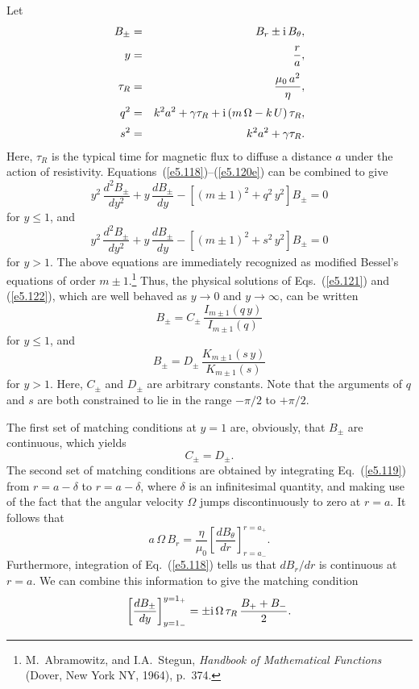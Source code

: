 Let
\begin{eqnarray}
B_\pm &=& B_r \pm {\rm i}\,B_\theta,\\[0.5ex]
y &=& \frac{r}{a},\\[0.5ex]
\tau_R &=& \frac{\mu_0\,a^2}{\eta},\\[0.5ex]
q^2 &=& k^2 a^2 + \gamma\tau_R + {\rm i}\,(m\,{\Omega} - k\,U)\,\tau_R,\\[0.5ex]
s^2 &=& k^2 a^2 + \gamma\tau_R.\label{e5.120e}
\end{eqnarray}
Here, $\tau_R$ is the typical time for magnetic flux to diffuse a distance $a$
under the action of resistivity. Equations~(\ref{e5.118})--(\ref{e5.120e}) can be
combined to give
\begin{equation}\label{e5.121}
y^2\,\frac{d^2 B_\pm}{dy^2} + y\,\frac{d B_\pm}{dy} -\left[(m\pm 1)^2 + q^2\,y^2\right]B_\pm = 0
\end{equation}
for $y\leq 1$, and
\begin{equation}\label{e5.122}
y^2\,\frac{d^2 B_\pm}{dy^2} + y\,\frac{d B_\pm}{dy} -\left[(m\pm 1)^2 + s^2\,y^2\right]B_\pm = 0
\end{equation}
for $y>1$. The above equations are immediately recognized as modified
Bessel's equations of order $m\pm 1$.\footnote{M.~Abramowitz, and I.A.~Stegun, {\em Handbook of Mathematical Functions} (Dover, New York NY, 1964), p.~374.} 
Thus, the physical solutions of Eqs.~(\ref{e5.121}) and (\ref{e5.122}), which are well behaved
as $y\rightarrow 0$ and $y\rightarrow\infty$, can be written
\begin{equation}\label{e5.123}
B_\pm = C_\pm\,\frac{I_{m\pm 1}(q\,y)}{I_{m\pm 1}(q)}
\end{equation}
for $y\leq 1$, and
\begin{equation}
B_\pm = D_\pm \, \frac{K_{m\pm 1}(s\,y)}{K_{m\pm 1}(s)}
\end{equation}
for $y>1$. Here, $C_\pm$ and $D_\pm$ are arbitrary constants.
Note that the arguments of $q$ and $s$ are both constrained to lie in the
range $-\pi/2$ to $+\pi/2$. 

The first set of matching conditions at $y=1$ are, obviously, that $B_\pm$ are
continuous, which yields
\begin{equation}
C_\pm = D_\pm.
\end{equation}
The second set of matching conditions are obtained by integrating Eq.~(\ref{e5.119})
from $r=a-\delta$ to $r=a-\delta$, where $\delta$ is an infinitesimal
 quantity, and making use of the fact that the angular velocity ${\Omega}$
jumps discontinuously to zero at $r=a$. It follows that
\begin{equation}
a\,{\Omega}\,B_r = \frac{\eta}{\mu_0}
\left[\frac{d B_\theta}{dr}\right]_{r=a_-}^{r=a_+}.
\end{equation}
Furthermore, integration of Eq.~(\ref{e5.118}) tells us that $dB_r/dr$ is continuous
at $r=a$. We can combine this information to give the matching
condition
\begin{equation}\label{e5.127}
\left[\frac{d B_\pm}{dy}\right]_{y=1_-}^{y=1_+} =\pm{\rm i}\,{\Omega}\,\tau_R\,
\frac{B_+ +B_-}{2}.
\end{equation}

